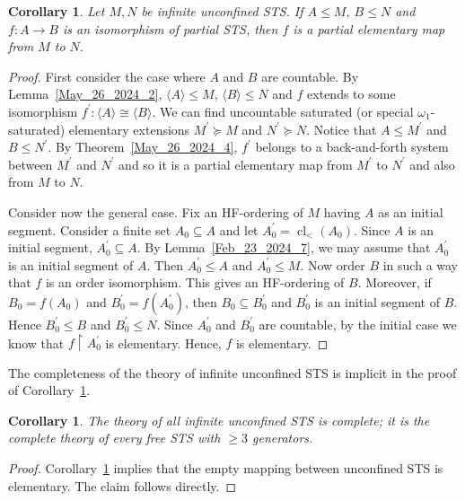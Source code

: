 \documentclass[a4paper, 11pt]{article}
\DeclareMathOperator{\cl}{cl}
\theoremstyle{note}
\newtheorem{cor}[thm]{Corollary}
\begin{document}
\begin{cor}\label{elementary} Let $M,N$ be infinite unconfined STS. If $A\leq M$, $B\leq N$ and $f:A\rightarrow B$ is an isomorphism of partial STS, then $f$ is a partial elementary map from $M$ to $N$.
	\end{cor}
	\begin{proof} First consider the case where $A$ and $B$ are countable.  By Lemma~\ref{May_26_2024_2}, $\langle A\rangle \leq M$,  $\langle B\rangle \leq N$  and $f$ extends to some isomorphism  $f^\prime:\langle A\rangle \cong \langle B\rangle $.
		 We can find uncountable saturated (or special $\omega_1$-saturated) elementary extensions  $M^\prime\succeq M$ and $N^\prime\succeq N$. Notice that  $A\leq M^\prime$  and $B\leq N^\prime$.  By  Theorem~\ref{May_26_2024_4}, $f^\prime$ belongs to a back-and-forth system between $M^\prime$ and $N^\prime$ and so it is a partial elementary map from $M^\prime$ to $N^\prime$ and also from $M$ to $N$.
		
		Consider now the general case.  Fix an HF-ordering of $M$ having $A$ as an initial segment.  Consider a finite set $A_0\subseteq A$ and let $A_0^\prime =\cl_<(A_0)$.  Since $A$ is an initial segment, $A_0^\prime\subseteq A$. By Lemma~\ref{Feb_23_2024_7},  we may assume that $A_0^\prime$ is an initial segment of  $A$. Then $A_0^\prime\leq A$  and  $A_0^\prime\leq M$. Now order $B$ in such a way that $f$ is an order isomorphism. This gives an HF-ordering of $B$.  Moreover, if $B_0=f(A_0)$ and $B_0^\prime= f(A_0^\prime)$, then  $B_0\subseteq B_0^\prime$ and $B_0^\prime$ is an initial segment of $B$. Hence  $B_0^\prime\leq B$  and  $B_0^\prime\leq N$. Since $A_0^\prime$ and $B_0^\prime$ are countable, by the initial case we know that $f\restriction A_0^\prime$ is elementary. Hence, $f$ is elementary.
	\end{proof}

 The completeness of the theory of infinite unconfined STS is implicit in the proof of Corollary~\ref{elementary}.
	
	\begin{cor} \label{completeness} The theory of all infinite unconfined STS is complete; it is the complete theory of every free STS with $\geq 3$ generators.
	\end{cor}
	\begin{proof}  Corollary~\ref{elementary} implies that the empty mapping between unconfined STS is elementary. The claim follows directly.
	\end{proof}
	
\end{document}
